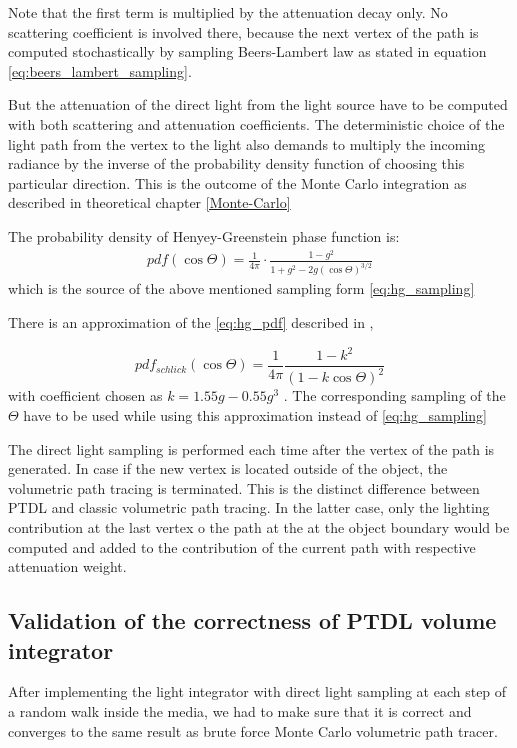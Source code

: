 Note that the first term is multiplied by the attenuation decay only. No scattering coefficient is
involved there, because the next vertex of the path is computed stochastically by sampling
Beers-Lambert law as stated in equation \ref{eq:beers_lambert_sampling}.

But the attenuation of the direct light from the light source have to be computed with both
scattering and attenuation coefficients. The deterministic choice of the light path from the vertex
to the light also demands to multiply the incoming radiance by the inverse of the probability
density function of choosing this particular direction. This is the outcome of the Monte Carlo
integration as described in theoretical chapter \ref{Monte-Carlo}

The probability density of Henyey-Greenstein phase function is: 
\begin{align}
\label{eq:hg_pdf}
pdf(\cos{\Theta}) = \frac{1}{4\pi}\cdot\frac{1-g^2}{1+g^2-2g(\cos{\Theta})^{3/2}}
\end{align}
which is the source of the above mentioned sampling form \ref{eq:hg_sampling}

There is an approximation of the \ref{eq:hg_pdf} described in \cite{CGF:CGFCGF123_0201},

\[
pdf_{schlick}(\cos{\Theta}) = \frac{1}{4\pi}\frac{1-k^2}{(1-k\cos{\Theta})^2}
\]
with coefficient chosen as $k=1.55g-0.55g^3$ \cite[p.~586]{pharr2010physically}. The corresponding
sampling of the $\Theta$ have to be used while using this approximation instead of
\ref{eq:hg_sampling}

The direct light sampling is performed each time after the vertex of the path is generated. In case
if the new vertex is located outside of the object, the volumetric path tracing is terminated. This
is the distinct difference between \gls{PTDL} and classic volumetric path tracing. In the latter
case, only the lighting contribution at the last vertex o the path at the at the object
boundary would be computed and added to the contribution of the current path with respective
attenuation weight.

\subsection{Validation of the correctness of PTDL volume integrator}
After implementing the light integrator with direct light sampling at each step of a random walk
inside the media, we had to make sure that it is correct and converges to the same result as brute
force Monte Carlo volumetric path tracer.

